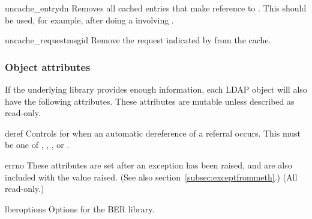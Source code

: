 \begin{methoddesc}[LDAP]{uncache_entry}{dn}
Removes all cached entries that make reference to . This should be
used, for example, after doing a  involving .
\end{methoddesc}


\begin{methoddesc}[LDAP]{uncache_request}{msgid}
Remove the request indicated by  from the cache.
\end{methoddesc}


\subsubsection{Object attributes}

If the underlying library provides enough information,
each LDAP object will also have the following attributes.
These attributes are mutable unless described as read-only.


\begin{memberdesc}[LDAP]{deref} %
    Controls for when an automatic dereference of a referral occurs.
    This must be one of
    , , ,
    or .
\end{memberdesc}


\begin{memberdesc}[LDAP]{errno} %
    These attributes are set after an exception has been raised, and
    are also included with the value raised. 
    (See also section~\ref{subsec:exceptfrommeth}.)
    (All read-only.)
\end{memberdesc}


\begin{memberdesc}[LDAP]{lberoptions} %
    Options for the BER library.
\end{memberdesc}

